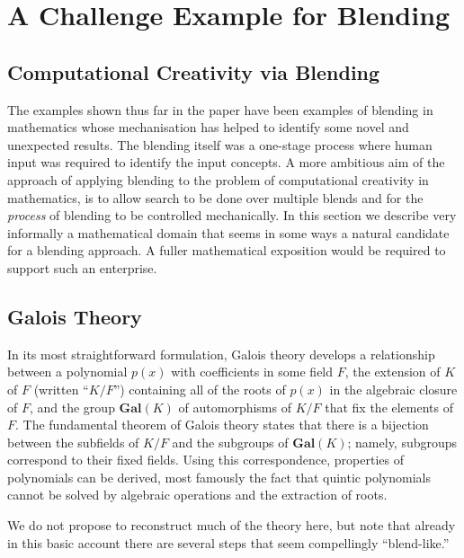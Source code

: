 \section{A Challenge Example for Blending} \label{galois}

\subsection{Computational Creativity via Blending}

The examples shown thus far in the paper have been examples of
blending in mathematics whose mechanisation has helped to identify
some novel and unexpected results. The blending itself was a one-stage
process where human input was required to identify the input
concepts. A more ambitious aim of the approach of applying blending to
the problem of computational creativity in mathematics, is to allow
search to be done over multiple blends and for the {\em process} of
blending to be controlled mechanically. In this section we describe
very informally a mathematical domain that seems in some ways a
natural candidate for a blending approach. A fuller mathematical
exposition would be required to support such an enterprise.


\subsection{Galois Theory}


In its most straightforward formulation, Galois theory develops a
relationship between a polynomial $p(x)$ with coefficients in some
field $F$, the extension of $K$ of $F$ (written ``$K/F$'') containing
all of the roots of $p(x)$ in the algebraic closure of $F$, and the
group $\mathbf{Gal}(K)$ of automorphisms of $K/F$ that fix the
elements of $F$.  The fundamental theorem of Galois theory states that
there is a bijection between the subfields of $K/F$ and the subgroups
of $\mathbf{Gal}(K)$; namely, subgroups correspond to their fixed
fields.  Using this correspondence, properties of polynomials can be
derived, most famously the fact that quintic polynomials cannot be
solved by algebraic operations and the extraction of roots.

We do not propose to reconstruct much of the theory here, but note
that already in this basic account there are several steps that seem
compellingly ``blend-like.''

